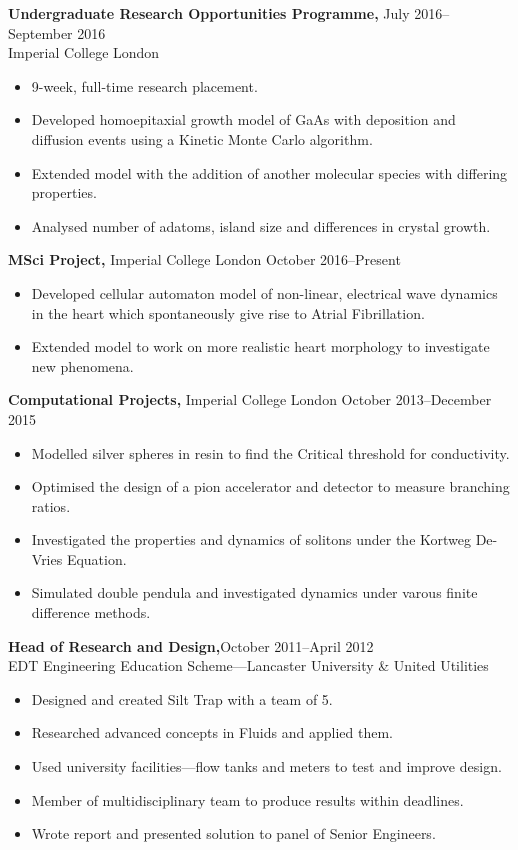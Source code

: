 \documentclass[margin]{res}
\begin{document}
\begin{resume}
  
 {\bf Undergraduate Research Opportunities Programme,} \hfill July 2016--September 2016\\ Imperial College London
 \begin{itemize} \itemsep -2pt  %
   \item 9-week, full-time research placement.
   \item Developed homoepitaxial growth model of GaAs with deposition and diffusion events using a Kinetic Monte Carlo algorithm.
   \item Extended model with the addition of another molecular species with differing properties. 
   \item Analysed number of adatoms, island size and differences in crystal growth.
 \end{itemize}


 {\bf MSci Project,} Imperial College London \hfill October 2016--Present
 \begin{itemize} \itemsep -2pt  %
   \item Developed cellular automaton model of non-linear, electrical wave dynamics in the heart which spontaneously give rise to Atrial Fibrillation.
   \item Extended model to work on more realistic heart morphology to investigate new phenomena. 
 \end{itemize}



 {\bf Computational Projects,} Imperial College London \hfill October 2013--December 2015
 \begin{itemize} \itemsep -2pt  %
\item Modelled silver spheres in resin to find the Critical threshold for conductivity.
\item Optimised the design of a pion accelerator and detector to measure branching ratios.
 \item Investigated the properties and dynamics of solitons under the Kortweg De-Vries Equation.
\item Simulated double pendula and investigated dynamics under varous finite difference methods.



 \end{itemize}

 {\bf Head of Research and Design,}\hfill October 2011--April 2012\\ EDT Engineering Education Scheme---Lancaster University \& United Utilities 
 \begin{itemize} \itemsep -2pt  %
 \item Designed and created Silt Trap with a team of 5.
\item Researched advanced concepts in Fluids and applied them.
\item Used university facilities---flow tanks and meters to test and improve design.
\item Member of multidisciplinary team to produce results within deadlines.
 \item Wrote report and presented solution to panel of Senior Engineers.
 

\end{itemize}
\end{resume}
\end{document}
